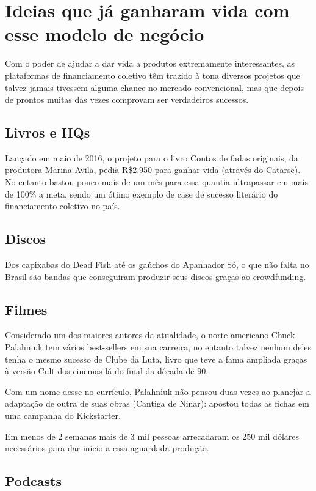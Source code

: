 \documentclass{classe_cn}                 %
\begin{document}
\section{Ideias que já ganharam vida com esse modelo de negócio}

Com o poder de ajudar a dar vida a produtos extremamente interessantes, as plataformas de financiamento coletivo têm trazido à tona diversos projetos que talvez jamais tivessem alguma chance no mercado convencional, mas que depois de prontos muitas das vezes comprovam ser verdadeiros sucessos.

\subsection{Livros e HQs}

Lançado em maio de 2016, o projeto para o livro Contos de fadas originais, da produtora Marina Avila, pedia R\$2.950 para ganhar vida (através do Catarse). No entanto bastou pouco mais de um mês para essa quantia ultrapassar em mais de 100\% a meta, sendo um ótimo exemplo de case de sucesso literário do financiamento coletivo no país.

\subsection{Discos}

Dos capixabas do Dead Fish até os gaúchos do Apanhador Só, o que não falta no Brasil são bandas que conseguiram produzir seus discos graças ao crowdfunding.

\subsection{Filmes}

Considerado um dos maiores autores da atualidade, o norte-americano Chuck Palahniuk tem vários best-sellers em sua carreira, no entanto talvez nenhum deles tenha o mesmo sucesso de Clube da Luta, livro que teve a fama ampliada graças à versão Cult dos cinemas lá do final da década de 90.

Com um nome desse no currículo, Palahniuk não pensou duas vezes ao planejar a adaptação de outra de suas obras (Cantiga de Ninar): apostou todas as fichas em uma campanha do Kickstarter.

Em menos de 2 semanas mais de 3 mil pessoas arrecadaram os 250 mil dólares necessários para dar início a essa aguardada produção.

\subsection{Podcasts}
\end{document}
